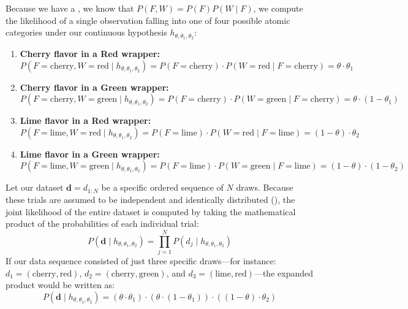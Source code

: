 Because we have a , we know that $P(F, W) = P(F)P(W \mid F)$, we compute the likelihood of a single observation falling into one of four possible atomic categories under our continuous hypothesis $h_{\theta, \theta_1, \theta_2}$:
\begin{enumerate}
    \item \textbf{Cherry flavor in a Red wrapper:}
    \[
    P(F=\text{cherry}, W=\text{red} \mid h_{\theta, \theta_1, \theta_2}) = P(F=\text{cherry}) \cdot P(W=\text{red} \mid F=\text{cherry}) = \theta \cdot \theta_1
    \]
    \item \textbf{Cherry flavor in a Green wrapper:}
    \[
    P(F=\text{cherry}, W=\text{green} \mid h_{\theta, \theta_1, \theta_2}) = P(F=\text{cherry}) \cdot P(W=\text{green} \mid F=\text{cherry}) = \theta \cdot (1-\theta_1)
    \]
    \item \textbf{Lime flavor in a Red wrapper:}
    \[
    P(F=\text{lime}, W=\text{red} \mid h_{\theta, \theta_1, \theta_2}) = P(F=\text{lime}) \cdot P(W=\text{red} \mid F=\text{lime}) = (1-\theta) \cdot \theta_2
    \]
    \item \textbf{Lime flavor in a Green wrapper:}
    \[
    P(F=\text{lime}, W=\text{green} \mid h_{\theta, \theta_1, \theta_2}) = P(F=\text{lime}) \cdot P(W=\text{green} \mid F=\text{lime}) = (1-\theta) \cdot (1-\theta_2)
    \]
\end{enumerate}

Let our dataset $\mathbf{d} = d_{1:N}$ be a specific ordered sequence of $N$ draws. Because these trials are assumed to be independent and identically distributed (), the joint likelihood of the entire dataset is computed by taking the mathematical product of the probabilities of each individual trial:
\[
P(\mathbf{d} \mid h_{\theta, \theta_1, \theta_2}) = \prod_{j=1}^{N} P(d_j \mid h_{\theta, \theta_1, \theta_2})
\]
If our data sequence consisted of just three specific draws—for instance: $d_1 = (\text{cherry}, \text{red})$, $d_2 = (\text{cherry}, \text{green})$, and $d_3 = (\text{lime}, \text{red})$—the expanded product would be written as:
\[
P(\mathbf{d} \mid h_{\theta, \theta_1, \theta_2}) = (\theta \cdot \theta_1) \cdot (\theta \cdot (1-\theta_1)) \cdot ((1-\theta) \cdot \theta_2)
\]

